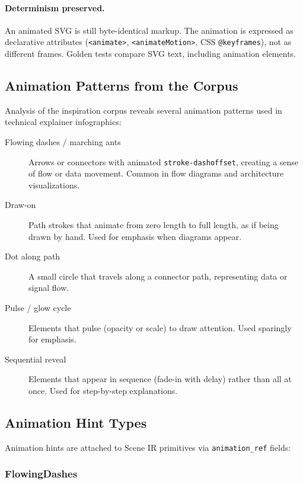 \paragraph{Determinism preserved.}
An animated SVG is still byte-identical markup. The animation is expressed as declarative attributes (\texttt{<animate>}, \texttt{<animateMotion>}, CSS \texttt{@keyframes}), not as different frames. Golden tests compare SVG text, including animation elements.

\subsection{Animation Patterns from the Corpus}

Analysis of the inspiration corpus reveals several animation patterns used in technical explainer infographics:

\begin{description}
  \item[Flowing dashes / marching ants] Arrows or connectors with animated \texttt{stroke-dashoffset}, creating a sense of flow or data movement. Common in flow diagrams and architecture visualizations.
  
  \item[Draw-on] Path strokes that animate from zero length to full length, as if being drawn by hand. Used for emphasis when diagrams appear.
  
  \item[Dot along path] A small circle that travels along a connector path, representing data or signal flow.
  
  \item[Pulse / glow cycle] Elements that pulse (opacity or scale) to draw attention. Used sparingly for emphasis.
  
  \item[Sequential reveal] Elements that appear in sequence (fade-in with delay) rather than all at once. Used for step-by-step explanations.
\end{description}

\subsection{Animation Hint Types}

Animation hints are attached to Scene IR primitives via \texttt{animation\_ref} fields:

\subsubsection{FlowingDashes}

